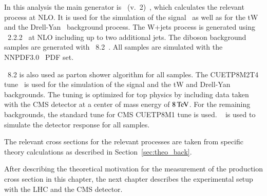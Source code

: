 In this analysis the main generator is \Powheg~(v.~2)~\cite{bib:powheg2,Frixione:2007vw,Nason:2004rx}, which calculates the relevant process at NLO. 
It is used for the simulation of the \ttbar signal~\cite{Frixione:2007nw} as well as for the tW~\cite{Re:2010bp} and the Drell-Yan~\cite{Kardos:2014dua,Alioli:2010qp} background process.
The W+jets process is generated using \MGaMCatNLO~2.2.2~\cite{Alwall:2014hca,Frederix:2012ps} at NLO including up to two additional jets. The diboson background samples are generated with \Pythia~8.2~\cite{Sjostrand:2014zea}.
All samples are simulated with the NNPDF3.0~\cite{Ball:2012cx} PDF set.

\Pythia~8.2 is also used as parton shower algorithm for all samples. The CUETP8M2T4 tune~\cite{CMS-PAS-TOP-16-021,Skands:2014pea} is used for the simulation of the signal and the tW and Drell-Yan backgrounds.
The tuning is optimized for top physics by including \ttbar data taken with the CMS detector at a center of mass energy of $8 \,\text{Te\hspace{-.08em}V}$.
For the remaining backgrounds, the standard tune for CMS CUETP8M1 tune is used.
~\cite{geant} is used to simulate the detector response for all samples.

The relevant cross sections for the relevant processes are taken from specific theory calculations as described in Section~\ref{sec:theo_back}.

After describing the theoretical motivation for the measurement of the \ttbar production cross section in this chapter, the next chapter describes the experimental setup with the LHC and the CMS detector.


